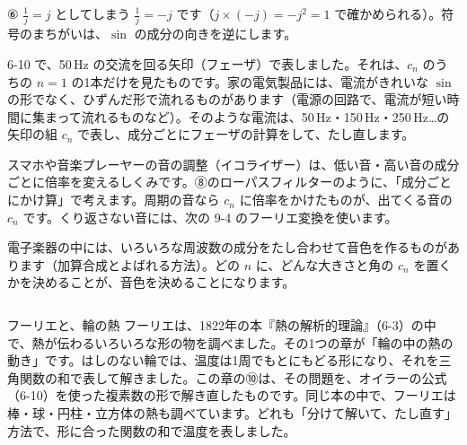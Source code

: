 \begin{tsumazuki}{⑥ $\frac{1}{j}=j$ としてしまう}
$\tfrac{1}{j}=-j$ です（$j\times(-j)=-j^2=1$ で確かめられる）。符号のまちがいは、$\sin$ の成分の向きを逆にします。
\end{tsumazuki}

\begin{butsuri}
\noindent\begin{minipage}[c]{0.64\linewidth}
\raggedright
6-10 で、50\,Hz の交流を回る矢印（フェーザ）で表しました。それは、$c_n$ のうちの $n=1$ の1本だけを見たものです。家の電気製品には、電流がきれいな $\sin$ の形でなく、ひずんだ形で流れるものがあります（電源の回路で、電流が短い時間に集まって流れるものなど）。そのような電流は、50\,Hz・150\,Hz・250\,Hz…の矢印の組 $c_n$ で表し、成分ごとにフェーザの計算をして、たし直します。
\end{minipage}\hfill
\begin{minipage}[c]{0.33\linewidth}
\centering
{}
\end{minipage}
\par\vspace{4pt}
スマホや音楽プレーヤーの音の調整（イコライザー）は、低い音・高い音の成分ごとに倍率を変えるしくみです。⑧のローパスフィルターのように、「成分ごとにかけ算」で考えます。周期の音なら $c_n$ に倍率をかけたものが、出てくる音の $c_n$ です。くり返さない音には、次の 9-4 のフーリエ変換を使います。
\par\vspace{4pt}
電子楽器の中には、いろいろな周波数の成分をたし合わせて音色を作るものがあります（加算合成とよばれる方法）。どの $n$ に、どんな大きさと角の $c_n$ を置くかを決めることが、音色を決めることになります。
\end{butsuri}

\begin{column}{フーリエと、輪の熱}
フーリエは、1822年の本『熱の解析的理論』（6-3）の中で、熱が伝わるいろいろな形の物を調べました。その1つの章が「輪の中の熱の動き」です。はしのない輪では、温度は1周でもとにもどる形になり、それを三角関数の和で表して解きました。この章の⑩は、その問題を、オイラーの公式（6-10）を使った複素数の形で解き直したものです。同じ本の中で、フーリエは棒・球・円柱・立方体の熱も調べています。どれも「分けて解いて、たし直す」方法で、形に合った関数の和で温度を表しました。
\end{column}

